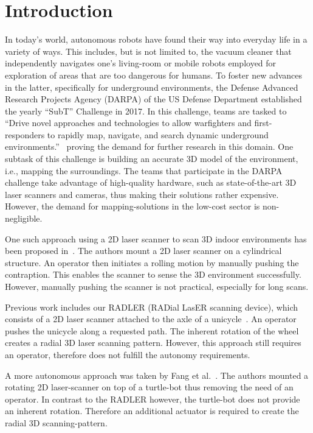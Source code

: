 \section{Introduction}
\label{sec:introduction}

In today's world, autonomous robots have found their way into everyday life in a variety of ways. 
This includes, but is not limited to, the vacuum cleaner that independently navigates one's living-room or mobile robots employed for exploration of areas that are too dangerous for humans.
To foster new advances in the latter, specifically for underground environments, the  Defense Advanced Research Projects Agency (DARPA) of the US Defense Department established the yearly ``SubT'' Challenge in 2017.
In this challenge, teams are tasked to ``Drive novel approaches and technologies to allow warfighters and first-responders to rapidly map, navigate, and search dynamic underground environments.''~\cite{allen} proving the demand for further research in this domain.
One subtask of this challenge is building an accurate 3D model of the environment, i.e., mapping the surroundings.
The teams that participate in the DARPA challenge take advantage of high-quality hardware, such as state-of-the-art 3D laser scanners and cameras, thus making their solutions rather expensive.
However, the demand for mapping-solutions in the low-cost sector is non-negligible.

One such approach using a 2D laser scanner to scan 3D indoor environments has been proposed in~\cite{classical_mechanics_scanner}.
The authors mount a 2D laser scanner on a cylindrical structure.
An operator then initiates a rolling motion by manually pushing the contraption.
This enables the scanner to sense the 3D environment successfully.
However, manually pushing the scanner is not practical, especially for long scans.

Previous work includes our RADLER (RADial LasER scanning device), which consists of a 2D laser scanner attached to the axle of a unicycle~\cite{ISER2018}.
An operator pushes the unicycle along a requested path.
The inherent rotation of the wheel creates a radial 3D laser scanning pattern.
However, this approach still requires an operator, therefore does not fulfill the autonomy requirements. 

A more autonomous approach was taken by Fang et al.~\cite{3D_per_2D_based}.
The authors mounted a rotating 2D laser-scanner on top of a turtle-bot thus removing the need of an operator.
In contrast to the RADLER however, the turtle-bot does not provide an inherent rotation.
Therefore an additional actuator is required to create the radial 3D scanning-pattern. 

